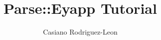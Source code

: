 \documentclass{article}
\title{Parse::Eyapp Tutorial}
\author{Casiano Rodriguez-Leon}
\begin{document}
\maketitle

\tableofcontents 

\pagebreak

\end{document}
